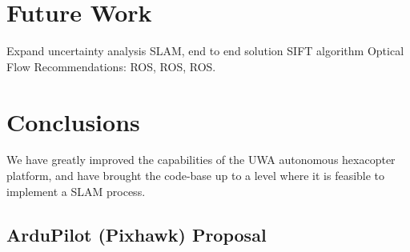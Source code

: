 \documentclass[a4paper, 11pt, titlepage]{article}
\begin{document}
\section{Future Work}
	Expand uncertainty analysis
	SLAM, end to end solution
	SIFT algorithm
	Optical Flow
	Recommendations:
		ROS, ROS, ROS.

\section{Conclusions}
	We have greatly improved the capabilities of the UWA autonomous hexacopter platform, and have brought the code-base up to a level where it is feasible to implement a SLAM process.





\renewcommand{\refname}{References}


%


\begin{appendices}
  \section{ArduPilot (Pixhawk) Proposal} \label{sec:PihawkProposal}
    

\end{appendices}

	
\end{document}
